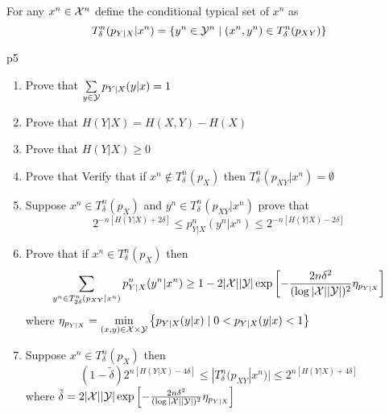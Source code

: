 \documentclass[a4paper, 11pt]{article}
\begin{document}
 For any $x^n\in \mathcal{X}^n$ define the conditional typical set of $x^n$ as $$T_{\delta}^n(p_{Y|X}|x^n)=\left\{ y^n\in \mathcal{Y}^n\mid (x^n,y^n)\in T_{\delta}^n(p_{XY}) \right\}$$


\begin{problem}{%
	}{p5%
	}
	\begin{enumerate}
		\item Prove that $\sum\limits_{y\in \mathcal{Y}}p_{Y|X}(y|x)=1$
		\item Prove that  $H(Y|X)=H(X,Y)-H(X)$ 
		\item Prove that $H(Y|X)\geq 0$
		\item Prove that Verify that if $x^n\notin T_{\delta}^n(p_X)$ then $T_{\delta}^n(p_{XY}|x^n)=\emptyset$
		\item Suppose $x^n\in T_{\delta}^n(p_X)$ and $y^n\in T_{\delta}^n(p_{XY}|x^n)$ prove that $$2^{-n[H(Y|X)+2\delta]}\leq p^n_{Y|X}(y^n|x^n)\leq 2^{-n[H(Y|X)-2\delta]}$$
		\item Prove that if $x^n\in T_{\delta}^n(p_{X})$ then $$\sum_{y^n\in T_{2\delta}^n(p_{XY}|x^n)}p_{Y|X}^n(y^n|x^n)\geq 1-2|\mathcal{X}||\mathcal{Y}|\exp\left[ -\frac{2n\delta^2}{(\log |\mathcal{X}||\mathcal{Y}|)^2} \eta_{p_{Y|X}}\right]$$ where $\eta_{p_{Y|X}}=\min\limits_{(x,y)\in \mathcal{X}\times \mathcal{Y}}\left\{ p_{Y|X}(y|x)\mid 0<p_{Y|X}(y|x)<1 \right\}$
		\item Suppose $x^n\in T_{\delta}^n(p_X)$ then $$(1-\tilde{\delta})2^{n[H(Y|X)-4\delta]}\leq |T_{\delta}^n(p_{XY}|x^n)|\leq 2^{n[H(Y|X)+4\delta]}$$ where $\tilde{\delta}=2|\mathcal{X}||\mathcal{Y}|\exp\left[ -\frac{2n\delta^2}{(\log |\mathcal{X}||\mathcal{Y}|)^2} \eta_{p_{Y|X}}\right]$
	\end{enumerate}
\end{problem}
\end{document}
